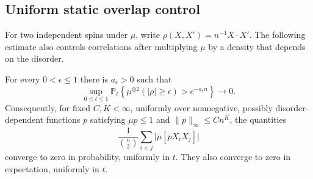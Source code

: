 \subsection{Uniform static overlap control}

For two independent spins under $\mu$, write
$\rho(X,X')=n^{-1}X\cdot X'$.  The following estimate also controls
correlations after multiplying $\mu$ by a density that depends on the disorder.

\begin{lemma}\label{lem:comparison-overlap}
For every $0<\epsilon\le1$ there is $a_\epsilon>0$ such that
\begin{equation}\label{eq:comparison-overlap-tail}
 \sup_{0\le t\le1}\mathbb P_t\left\{
   \mu^{\otimes2}(|\rho|\ge\epsilon)>e^{-a_\epsilon n}
 \right\}\longrightarrow0.
\end{equation}
Consequently, for fixed $C,K<\infty$, uniformly over nonnegative,
possibly disorder-dependent functions $p$ satisfying
$\mu p\le1$ and $\|p\|_\infty\le Cn^K$, the quantities
\[
 \frac1{\binom n2}\sum_{i<j}\big|\mu[pX_iX_j]\big|
\]
converge to zero in probability, uniformly in $t$.  They also converge to
zero in expectation, uniformly in $t$.
\end{lemma}

